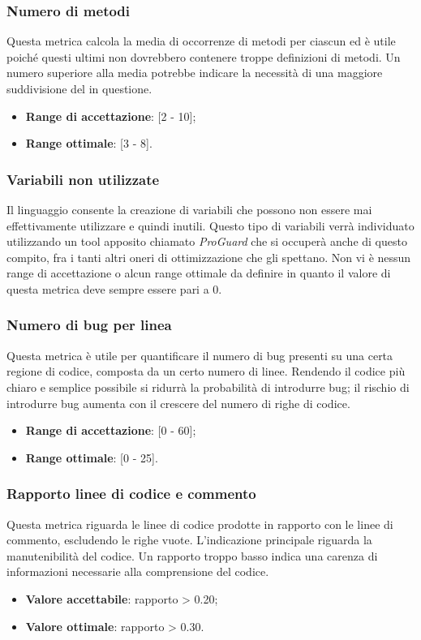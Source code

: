 \subsubsection{Numero di metodi}
Questa metrica calcola la media di occorrenze di metodi per ciascun  ed è utile poiché questi ultimi non dovrebbero contenere troppe definizioni di metodi. Un numero superiore alla media potrebbe indicare la necessità di una maggiore suddivisione del  in questione.
\begin{itemize}
	\item \textbf{Range di accettazione}: [2 - 10];
	\item \textbf{Range ottimale}: [3 - 8].
\end{itemize}
\subsubsection{Variabili non utilizzate}
Il linguaggio  consente la creazione di variabili che possono non essere mai effettivamente utilizzare e quindi inutili. Questo tipo di variabili verrà individuato utilizzando un tool apposito chiamato \textit{ProGuard} che si occuperà anche di questo compito, fra i tanti altri oneri di ottimizzazione che gli spettano.
Non vi è nessun range di accettazione o alcun range ottimale da definire in quanto il valore di questa metrica deve sempre essere pari a 0.
\subsubsection{Numero di bug per linea}
Questa metrica è utile per quantificare il numero di bug presenti su una certa regione di codice, composta da un certo numero di linee. Rendendo il codice più chiaro e semplice possibile si ridurrà la probabilità di introdurre bug; il rischio di introdurre bug aumenta con il crescere del numero di righe di codice.
\begin{itemize}
	\item \textbf{Range di accettazione}: [0 - 60];
	\item \textbf{Range ottimale}: [0 - 25].
\end{itemize}
\subsubsection{Rapporto linee di codice e commento}
Questa metrica riguarda le linee di codice prodotte in rapporto con le linee di commento, escludendo le righe vuote. L'indicazione principale riguarda la manutenibilità del codice. Un rapporto troppo basso indica una carenza di informazioni necessarie alla comprensione del codice.
\begin{itemize}
	\item \textbf{Valore accettabile}: rapporto \textgreater { 0.20};
	\item \textbf{Valore ottimale}: rapporto \textgreater { 0.30}.
\end{itemize}
